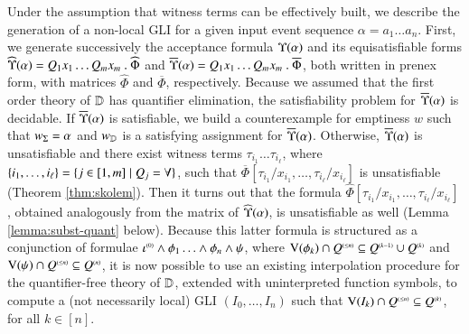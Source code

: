 Under the assumption that witness terms can be effectively built, we
describe the generation of a non-local GLI for a given input event
sequence $\alpha = a_1 \ldots a_n$. First, we generate successively
the acceptance formula $\Upsilon({\alpha})$ and its equisatisfiable
forms $\widehat{\Upsilon}({\alpha}) = Q_1x_1 \ldots Q_mx_m ~.~ \widehat{\Phi}$
and $\overline{\Upsilon}({\alpha}) = Q_1x_1 \ldots Q_mx_m ~.~ \overline{\Phi}$,
both written in prenex form, with matrices $\widehat{\Phi}$ and
$\overline{\Phi}$, respectively. Because we assumed that the first
order theory of $\mathbb{D}$ has quantifier elimination, the satisfiability
problem for $\overline{\Upsilon}({\alpha})$ is decidable. If $\overline{\Upsilon}({\alpha})$
is satisfiable, we build a counterexample for emptiness $w$ such that
${w}_\Sigma=\alpha$ and ${w}_{\mathbb{D}}$ is a satisfying assignment for
$\overline{\Upsilon}({\alpha})$. Otherwise, $\overline{\Upsilon}({\alpha})$ is unsatisfiable
and there exist witness terms $\tau_{i_1} \ldots \tau_{i_\ell}$, where
$\{ i_1, \ldots, i_\ell \} = \{ j \in [1,m] \mid Q_j = \forall \}$,
such that $\overline{\Phi}[\tau_{i_1}/x_{i_1}, \ldots,
  \tau_{i_\ell}/x_{i_\ell}]$ is unsatisfiable (Theorem
\ref{thm:skolem}). Then it turns out that the formula
$\widehat{\Phi}[\tau_{i_1}/x_{i_1}, \ldots,
  \tau_{i_\ell}/x_{i_\ell}]$, obtained analogously from the matrix of
$\widehat{\Upsilon}({\alpha})$, is unsatisfiable as well (Lemma
\ref{lemma:subst-quant} below). Because this latter formula is
structured as a conjunction of formulae ${\iota}^{\scriptscriptstyle{({0})}} \wedge
\phi_1 \ldots \wedge \phi_n \wedge \psi$, where $\mathrm{V}({\phi_k}) \cap
{Q}^{\scriptscriptstyle{({\leq n})}} \subseteq {Q}^{\scriptscriptstyle{({k-1})}} \cup {Q}^{\scriptscriptstyle{({k})}}$ and
$\mathrm{V}({\psi}) \cap {Q}^{\scriptscriptstyle{({\leq n})}} \subseteq {Q}^{\scriptscriptstyle{({n})}}$, it is now
possible to use an existing interpolation procedure for the
quantifier-free theory of $\mathbb{D}$, extended with uninterpreted
function symbols, to compute a (not necessarily local) GLI $(I_0,
\ldots, I_n)$ such that $\mathrm{V}({I_k}) \cap {Q}^{\scriptscriptstyle{({\leq n})}} \subseteq
{Q}^{\scriptscriptstyle{({k})}}$, for all $k \in [n]$.


